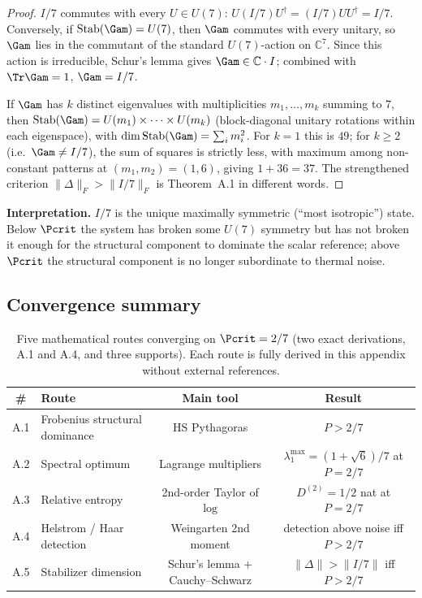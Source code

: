 \begin{proof}
$I/7$ commutes with every $U \in U(7)$: $U(I/7)U^{\dagger} = (I/7)UU^{\dagger} = I/7$.
Conversely, if $\mathrm{Stab}(\Gam) = U(7)$, then $\Gam$ commutes with every
unitary, so $\Gam$ lies in the commutant of the standard $U(7)$-action on
$\mathbb{C}^7$. Since this action is irreducible, Schur's lemma gives
$\Gam \in \mathbb{C}\cdot I$; combined with $\Tr\Gam = 1$, $\Gam = I/7$.

If $\Gam$ has $k$ distinct eigenvalues with multiplicities
$m_1,\dots,m_k$ summing to $7$, then
$\mathrm{Stab}(\Gam) = U(m_1)\times\cdots\times U(m_k)$ (block-diagonal
unitary rotations within each eigenspace), with
$\dim\mathrm{Stab}(\Gam) = \sum_i m_i^2$. For $k = 1$ this is $49$; for
$k \geq 2$ (i.e.\ $\Gam \neq I/7$), the sum of squares is strictly less,
with maximum among non-constant patterns at $(m_1,m_2) = (1,6)$, giving
$1 + 36 = 37$. The strengthened criterion $\|\Delta\|_F > \|I/7\|_F$ is
Theorem~A.1 in different words.
\end{proof}

\textbf{Interpretation.} $I/7$ is the unique maximally symmetric (``most
isotropic'') state. Below $\Pcrit$ the system has broken some $U(7)$ symmetry
but has not broken it enough for the structural component
to dominate the scalar reference; above $\Pcrit$ the structural
component is no longer subordinate to thermal noise.

\subsection{Convergence summary}

\begin{table}[H]
\centering
\caption{Five mathematical routes converging on $\Pcrit = 2/7$ (two exact
derivations, A.1 and A.4, and three supports). Each route is fully derived in
this appendix without external references.}
\label{tab:pcrit-derivations}
\begin{tabular}{@{}clcc@{}}
\toprule
\textbf{\#} & \textbf{Route} & \textbf{Main tool} & \textbf{Result}\\
\midrule
A.1 & Frobenius structural dominance & HS Pythagoras   & $P > 2/7$\\
A.2 & Spectral optimum               & Lagrange multipliers   & $\lambda_1^{\max} = (1+\sqrt 6)/7$ at $P = 2/7$\\
A.3 & Relative entropy               & 2nd-order Taylor of $\log$ & $D^{(2)} = 1/2$ nat at $P = 2/7$\\
A.4 & Helstrom / Haar detection      & Weingarten 2nd moment   & detection above noise iff $P > 2/7$\\
A.5 & Stabilizer dimension           & Schur's lemma + Cauchy--Schwarz & $\|\Delta\| > \|I/7\|$ iff $P > 2/7$\\
\bottomrule
\end{tabular}
\end{table}

